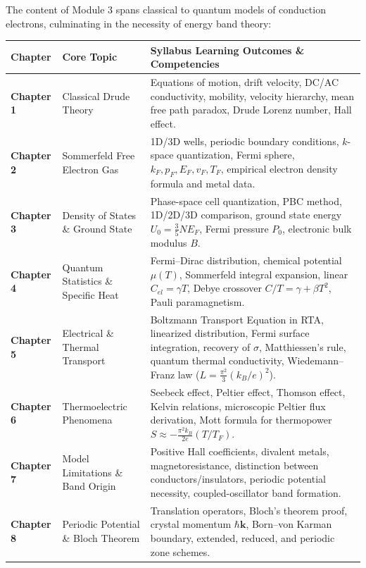 \documentclass[11pt,a4paper]{article}
\newcommand{\vb}[1]{\mathbf{#1}}
\begin{document}
The content of Module 3 spans classical to quantum models of conduction electrons, culminating in the necessity of energy band theory:

\begin{table}[ht]
\centering
\small
\renewcommand{\arraystretch}{1.25}
\begin{tabular}{p{2.2cm} p{5.0cm} p{8.2cm}}
\toprule
\textbf{Chapter} & \textbf{Core Topic} & \textbf{Syllabus Learning Outcomes \& Competencies} \\
\midrule
\textbf{Chapter 1} & Classical Drude Theory & Equations of motion, drift velocity, DC/AC conductivity, mobility, velocity hierarchy, mean free path paradox, Drude Lorenz number, Hall effect. \\
\textbf{Chapter 2} & Sommerfeld Free Electron Gas & 1D/3D wells, periodic boundary conditions, $k$-space quantization, Fermi sphere, $k_F, p_F, E_F, v_F, T_F$, empirical electron density formula and metal data. \\
\textbf{Chapter 3} & Density of States \& Ground State & Phase-space cell quantization, PBC method, 1D/2D/3D comparison, ground state energy $U_0 = \frac{3}{5}NE_F$, Fermi pressure $P_0$, electronic bulk modulus $B$. \\
\textbf{Chapter 4} & Quantum Statistics \& Specific Heat & Fermi--Dirac distribution, chemical potential $\mu(T)$, Sommerfeld integral expansion, linear $C_{el} = \gamma T$, Debye crossover $C/T = \gamma + \beta T^2$, Pauli paramagnetism. \\
\textbf{Chapter 5} & Electrical \& Thermal Transport & Boltzmann Transport Equation in RTA, linearized distribution, Fermi surface integration, recovery of $\sigma$, Matthiessen's rule, quantum thermal conductivity, Wiedemann--Franz law ($L = \frac{\pi^2}{3}(k_B/e)^2$). \\
\textbf{Chapter 6} & Thermoelectric Phenomena & Seebeck effect, Peltier effect, Thomson effect, Kelvin relations, microscopic Peltier flux derivation, Mott formula for thermopower $S \approx -\frac{\pi^2 k_B}{2e}(T/T_F)$. \\
\textbf{Chapter 7} & Model Limitations \& Band Origin & Positive Hall coefficients, divalent metals, magnetoresistance, distinction between conductors/insulators, periodic potential necessity, coupled-oscillator band formation. \\
\textbf{Chapter 8} & Periodic Potential \& Bloch Theorem & Translation operators, Bloch's theorem proof, crystal momentum $\hbar\vb{k}$, Born--von Karman boundary, extended, reduced, and periodic zone schemes. \\

\end{tabular}
\end{table}
\end{document}
